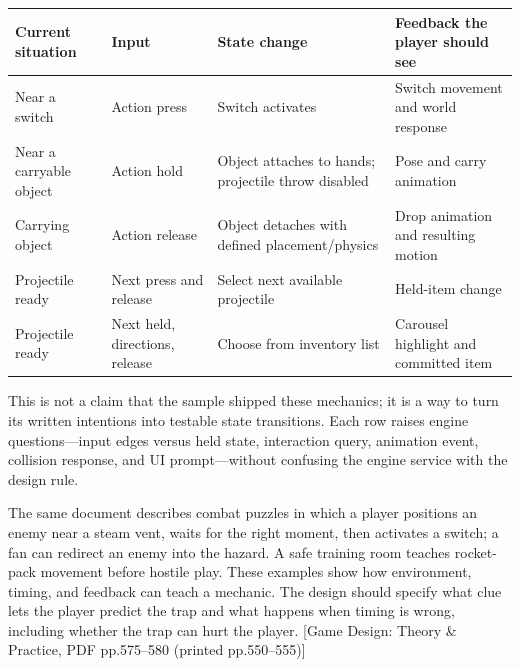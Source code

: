 {\def\LTcaptype{none} %
\begin{longtable}[]{@{}
  >{\raggedright\arraybackslash}p{}
  >{\raggedright\arraybackslash}p{}
  >{\raggedright\arraybackslash}p{}
  >{\raggedright\arraybackslash}p{}@{}}
\toprule\noalign{}
\begin{minipage}[b]{\linewidth}\raggedright
Current situation
\end{minipage} & \begin{minipage}[b]{\linewidth}\raggedright
Input
\end{minipage} & \begin{minipage}[b]{\linewidth}\raggedright
State change
\end{minipage} & \begin{minipage}[b]{\linewidth}\raggedright
Feedback the player should see
\end{minipage} \\
\midrule\noalign{}
\endhead
\bottomrule\noalign{}
\endlastfoot
Near a switch & Action press & Switch activates & Switch movement and world response \\
Near a carryable object & Action hold & Object attaches to hands; projectile throw disabled & Pose and carry animation \\
Carrying object & Action release & Object detaches with defined placement/physics & Drop animation and resulting motion \\
Projectile ready & Next press and release & Select next available projectile & Held-item change \\
Projectile ready & Next held, directions, release & Choose from inventory list & Carousel highlight and committed item \\
\end{longtable}
}

This is not a claim that the sample shipped these mechanics; it is a way to turn its written intentions into testable state transitions. Each row raises engine questions---input edges versus held state, interaction query, animation event, collision response, and UI prompt---without confusing the engine service with the design rule.

The same document describes combat puzzles in which a player positions an enemy near a steam vent, waits for the right moment, then activates a switch; a fan can redirect an enemy into the hazard. A safe training room teaches rocket-pack movement before hostile play. These examples show how environment, timing, and feedback can teach a mechanic. The design should specify what clue lets the player predict the trap and what happens when timing is wrong, including whether the trap can hurt the player. {[}Game Design: Theory \& Practice, PDF pp.575--580 (printed pp.550--555){]}

